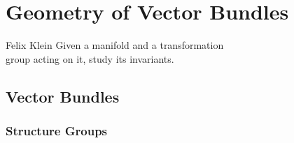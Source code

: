 \chapter{Geometry of Vector Bundles}

\begin{epigraph}{17em}{Felix Klein}
	Given a manifold and a transformation\\
	group acting on it, study its invariants.
\end{epigraph}

\section{Vector Bundles}

\subsection{Structure Groups}\label{sec:structure-groups}


